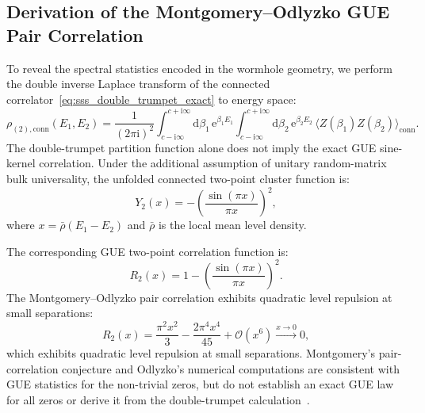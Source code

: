 \documentclass[11pt,a4paper,reqno]{article}
\theoremstyle{plain}
\theoremstyle{definition}
\theoremstyle{remark}
\numberwithin{equation}{section}
\providecommand{\diff}{\mathrm{d}}
\begin{document}
\subsection{Derivation of the Montgomery--Odlyzko GUE Pair Correlation}
To reveal the spectral statistics encoded in the wormhole geometry, we perform the double inverse Laplace transform of the connected correlator~\eqref{eq:sss_double_trumpet_exact} to energy space:
\begin{equation}
  \rho_{(2),\mathrm{conn}}(E_1, E_2) = \frac{1}{(2\pi \mathrm{i})^2} \int_{c-\mathrm{i}\infty}^{c+\mathrm{i}\infty} \diff\beta_1 \, \mathrm{e}^{\beta_1 E_1} \int_{c-\mathrm{i}\infty}^{c+\mathrm{i}\infty} \diff\beta_2 \, \mathrm{e}^{\beta_2 E_2} \, \langle Z(\beta_1) Z(\beta_2) \rangle_{\mathrm{conn}}.
  \label{eq:inverse_laplace_density}
\end{equation}
The double-trumpet partition function alone does not imply the exact GUE sine-kernel correlation. Under the additional assumption of unitary random-matrix bulk universality, the unfolded connected two-point cluster function is:
\begin{equation}
  Y_2(x) = -\left( \frac{\sin(\pi x)}{\pi x} \right)^2,
  \label{eq:sine_kernel_cluster}
\end{equation}
where $x = \bar{\rho}(E_1-E_2)$ and $\bar{\rho}$ is the local mean level density.

The corresponding GUE two-point correlation function is:
\begin{equation}
  R_2(x) = 1 - \left( \frac{\sin(\pi x)}{\pi x} \right)^2.
  \label{eq:montgomery_odlyzko}
\end{equation}
The Montgomery--Odlyzko pair correlation exhibits quadratic level repulsion at small separations:
\begin{equation}
  R_2(x) = \frac{\pi^2 x^2}{3} - \frac{2\pi^4 x^4}{45} + \mathcal{O}(x^6) \xrightarrow{x \to 0} 0,
  \label{eq:level_repulsion}
\end{equation}
which exhibits quadratic level repulsion at small separations. Montgomery's pair-correlation conjecture and Odlyzko's numerical computations are consistent with GUE statistics for the non-trivial zeros, but do not establish an exact GUE law for all zeros or derive it from the double-trumpet calculation~\cite{Odlyzko1987}.
\end{document}
